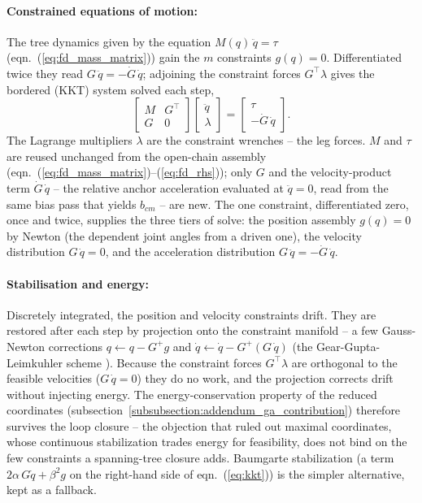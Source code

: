 \paragraph{Constrained equations of motion:} The tree dynamics given by the equation
$M(q)\,\ddot{q} = \tau$ (eqn.~(\ref{eq:fd_mass_matrix})) gain the $m$ constraints $g(q) =
0$. Differentiated twice they read $G\,\ddot{q} = -\dot{G}\,\dot{q}$; adjoining the
constraint forces $G^{\!\top} \lambda$ gives the bordered (KKT) system solved each step,
\begin{equation}
    \begin{bmatrix} M & G^{\!\top} \\[2pt] G & 0 \end{bmatrix}
    \begin{bmatrix} \ddot{q} \\[2pt] \lambda \end{bmatrix}
    =
    \begin{bmatrix} \tau \\[2pt] -\dot{G}\,\dot{q} \end{bmatrix}.
    \label{eq:kkt}
\end{equation}
The Lagrange multipliers $\lambda$ are the constraint wrenches -- the leg forces. $M$ and
$\tau$ are reused unchanged from the open-chain assembly
(eqn.~(\ref{eq:fd_mass_matrix})--(\ref{eq:fd_rhs})); only $G$ and the velocity-product
term $\dot{G}\,\dot{q}$ -- the relative anchor acceleration evaluated at $\ddot{q} = 0$,
read from the same bias pass that yields $b_{cm}$ -- are new. The one constraint,
differentiated zero, once and twice, supplies the three tiers of solve: the position
assembly $g(q) = 0$ by Newton (the dependent joint angles from a driven one), the velocity
distribution $G\,\dot{q} = 0$, and the acceleration distribution $G\,\ddot{q} =
-\dot{G}\,\dot{q}$.

\paragraph{Stabilisation and energy:} Discretely integrated, the position and velocity
constraints drift. They are restored after each step by projection onto the constraint
manifold -- a few Gauss-Newton corrections $q \leftarrow q - G^{+} g$ and $\dot{q}
\leftarrow \dot{q} - G^{+}(G\,\dot{q})$ (the Gear-Gupta-Leimkuhler scheme
\cite{Gear_Gupta_Leimkuhler_constrained_integration:1985}). Because the
constraint forces $G^{\!\top}\lambda$ are orthogonal to the feasible velocities
($G\,\dot{q} = 0$) they do no work, and the projection corrects drift without injecting
energy. The energy-conservation property of the reduced coordinates
(subsection~\ref{subsubsection:addendum_ga_contribution}) therefore survives the loop closure
-- the objection that ruled out maximal coordinates, whose continuous stabilization trades
energy for feasibility, does not bind on the few constraints a spanning-tree closure adds.
Baumgarte stabilization \cite{Baumgarte_constraint_stabilization:1972} (a term
$2\alpha\,G\dot{q} + \beta^2 g$ on the right-hand side of eqn.~(\ref{eq:kkt})) is the
simpler alternative, kept as a fallback.

